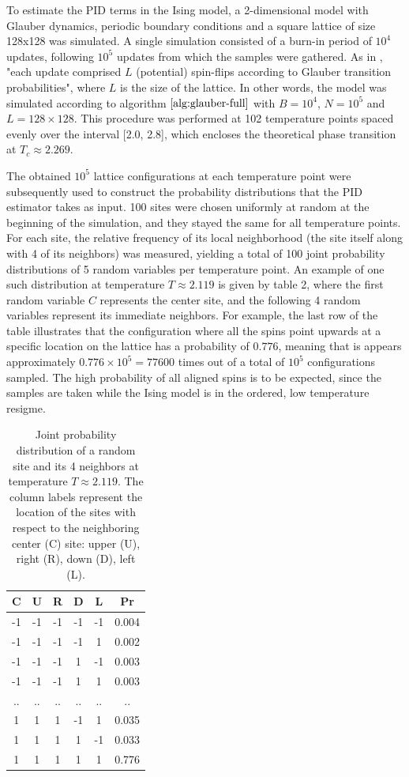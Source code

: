 \documentclass[12pt]{article}
\begin{document}
To estimate the PID terms in the Ising model, a 2-dimensional model with Glauber dynamics, periodic boundary conditions and a square lattice of size 128x128 was simulated. A single simulation consisted of a burn-in period of $10^4$ updates, following $10^5$ updates from which the samples were gathered. As in \cite{barnett-ising}, "each update comprised $L$ (potential) spin-flips according to Glauber transition probabilities", where $L$ is the size of the lattice. In other words, the model was simulated according to algorithm $\ref{alg:glauber-full}$ with $B=10^4$, $N=10^5$ and $L=128\times128$. This procedure was performed at 102 temperature points spaced evenly over the interval [2.0, 2.8], which encloses the theoretical phase transition at $T_c \approx 2.269$. 

The obtained $10^5$ lattice configurations at each temperature  point were subsequently used to construct the probability distributions that the PID estimator takes as input. 100 sites were chosen uniformly at random at the beginning of the simulation, and they stayed the same for all temperature points. For each site, the relative frequency of its local neighborhood (the site itself along with 4 of its neighbors) was measured, yielding a total of 100 joint probability distributions of 5 random variables per temperature point. An example of one such distribution at temperature $T \approx 2.119$ is given by table 2, where the first random variable $C$ represents the center site, and the following 4 random variables represent its immediate neighbors. For example, the last row of the table illustrates that the configuration where all the spins point upwards at a specific location on the lattice has a probability of $0.776$, meaning that is appears approximately $0.776 \times 10^5 = 77 600$ times out of a total of $10^5$ configurations sampled. The high probability of all aligned spins is to be expected, since the samples are taken while the Ising model is in the ordered, low temperature resigme.

\begin{table}[h!]
\centering
\caption{Joint probability distribution of a random site and its 4 neighbors at temperature $T \approx 2.119$. The column labels represent the location of the sites with respect to the neighboring center (C) site: upper (U), right (R), down (D), left (L).}
\begin{tabular}{c c c c c c}
	\hline
	C & U & R & D & L & Pr\\ 
	\hline
	-1 & -1 & -1 & -1 & -1 & 0.004 \\
	-1 & -1 & -1 & -1 & 1 & 0.002 \\
	-1 & -1 & -1 & 1 & -1 & 0.003 \\
	-1 & -1 & -1 & 1 & 1 & 0.003 \\
	.. & .. & .. &  .. & .. & .. \\
	1 & 1 & 1 & -1 & 1 & 0.035 \\
 	1 & 1 & 1 & 1 & -1 & 0.033 \\
 	1 & 1 & 1 & 1 & 1 & 0.776 \\
 	\hline
\end{tabular}
\label{table:4}
\end{table}
\end{document}
